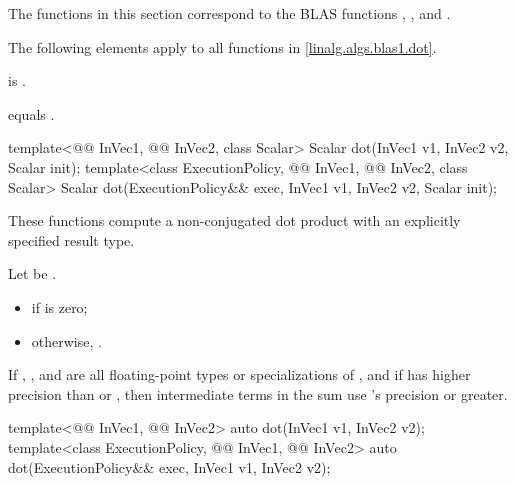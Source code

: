 \pnum
\begin{note}
The functions in this section correspond to the BLAS
functions , , and \supercite{blas1}.
\end{note}

\pnum
The following elements apply to all functions in \ref{linalg.algs.blas1.dot}.

\pnum
\mandates
{} is .

\pnum
\expects
{} equals .

%
\begin{itemdecl}
template<@@ InVec1, @@ InVec2, class Scalar>
  Scalar dot(InVec1 v1, InVec2 v2, Scalar init);
template<class ExecutionPolicy, @@ InVec1, @@ InVec2, class Scalar>
  Scalar dot(ExecutionPolicy&& exec,
             InVec1 v1, InVec2 v2, Scalar init);
\end{itemdecl}

\begin{itemdescr}
\pnum
These functions compute a non-conjugated dot product
with an explicitly specified result type.

\pnum
\returns
Let  be .
\begin{itemize}
\item
{} if  is zero;
\item
otherwise,
.
\end{itemize}

\pnum
\remarks
If , , and 
are all floating-point types or specializations of ,
and if  has higher precision
than  or ,
then intermediate terms in the sum use 's precision or greater.
\end{itemdescr}

%
\begin{itemdecl}
  template<@@ InVec1, @@ InVec2>
    auto dot(InVec1 v1, InVec2 v2);
  template<class ExecutionPolicy, @@ InVec1, @@ InVec2>
    auto dot(ExecutionPolicy&& exec,
             InVec1 v1, InVec2 v2);
\end{itemdecl}

